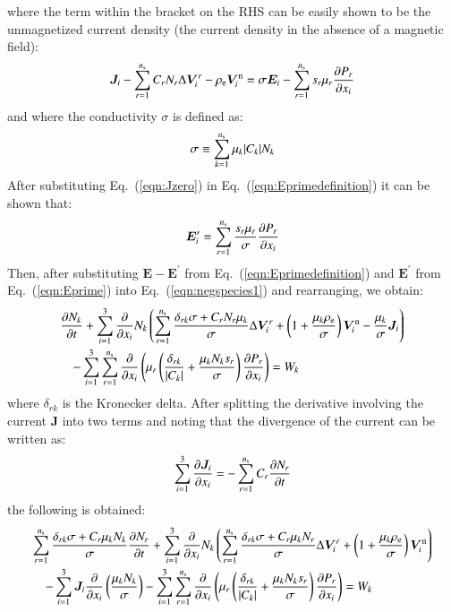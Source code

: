 \documentclass[twoside,onecolumn,10pt]{waflarticle}
\renewcommand{\vec}[1]{\bm{#1}}
\newcommand{\alb}{\vspace{0.1cm}\\} %
\newcommand{\mfd}{\displaystyle}
\newcommand{\ns}{{n_{\rm s}}}
\renewcommand{\vec}[1]{\bm{ #1 }}
\begin{document}
%
where the term within the bracket on the RHS can be easily shown to be the unmagnetized current density (the current density in the absence of a magnetic field):
%
\begin{equation}
\mfd  \vec{J}_i-\sum_{r=1}^\ns C_r N_r \Delta \vec{V}_i^r  - \rho_{\rm e} \vec{V}_i^{\rm n} =   \sigma \vec{E}_i 
             -  \sum_{r=1}^\ns s_r \mu_r  \frac{\partial P_r}{\partial x_i}
\label{eqn:Jzero}
\end{equation}
%
and where the conductivity $\sigma$ is defined as:
%
\begin{equation}
  \sigma \equiv \sum_{k=1}^\ns \mu_k |C_k| N_k 
\end{equation}
%
After substituting Eq.\ (\ref{eqn:Jzero}) in Eq.\ (\ref{eqn:Eprimedefinition}) it can be shown that:
%
\begin{equation}
   \vec{E}_i^\prime =   
   \sum_{r=1}^\ns \frac{s_r \mu_r }{\sigma}  \frac{\partial P_r}{\partial x_i}
\label{eqn:Eprime}
\end{equation}
%
Then, after substituting $\vec{E}-\vec{E}^\prime$ from Eq.\ (\ref{eqn:Eprimedefinition}) and $\vec{E}^\prime$ from Eq.\ (\ref{eqn:Eprime}) into Eq.\ (\ref{eqn:negspecies1}) and rearranging, we obtain:
%
\begin{equation}
\begin{array}{l}\mfd
  \frac{\partial N_k}{\partial t} 
+ \sum_{i=1}^3 \frac{\partial}{\partial x_i}   N_k \left(      \sum_{r=1}^\ns \frac{\delta_{rk}\sigma+ C_r N_r \mu_k}{\sigma}   \Delta \vec{V}_i^r +\left(1+\frac{\mu_k \rho_{\rm e}}{\sigma}\right)\vec{V}^{\rm n}_i - \frac{\mu_k}{\sigma}  \vec{J}_i \right)
\alb\mfd~~~~
- \sum_{i=1}^3 \sum_{r=1}^{\ns} \frac{\partial}{\partial x_i} \left( \mu_r \left( \frac{\delta_{rk}}{|C_k|}+ \frac{ \mu_k N_k s_r }{\sigma} \right) \frac{\partial P_r}{\partial x_i}\right) 
= 
W_k
\end{array}
\end{equation}
%
where $\delta_{rk}$ is the Kronecker delta. 
After splitting the derivative involving the current $\vec{J}$ into two terms and noting that the divergence of the current can be written as:
%
\begin{equation}
\sum_{i=1}^3 \frac{\partial \vec{J}_i}{\partial x_i}=-\sum_{r=1}^\ns C_r \frac{\partial N_r}{\partial t}
\end{equation}
%
the following is obtained:
%
\begin{equation}
\begin{array}{l}\mfd
  \sum_{r=1}^{\ns} \frac{\delta_{rk}\sigma+C_r  \mu_k N_k}{\sigma} \frac{\partial N_r}{\partial t}  
+ \sum_{i=1}^3 \frac{\partial}{\partial x_i}   N_k \left(\sum_{r=1}^\ns \frac{\delta_{rk}\sigma+C_r  \mu_k N_r}{\sigma} \Delta \vec{V}_i^r +\left(1+\frac{\mu_k\rho_{\rm e}}{\sigma}\right)\vec{V}^{\rm n}_i\right) 
\alb\mfd~~~~
- \sum_{i=1}^3 \vec{J}_i \frac{\partial}{\partial x_i}  \left( \frac{\mu_k N_k}{\sigma} 
\right) 
- \sum_{i=1}^3 \sum_{r=1}^{\ns} \frac{\partial}{\partial x_i} \left(\mu_r \left(\frac{ \delta_{rk} }{ |C_k|}+   \frac{ \mu_k N_k s_r}{\sigma}\right)  \frac{\partial P_r}{\partial x_i}\right) 
= W_k
\end{array}
\end{equation}
\end{document}
